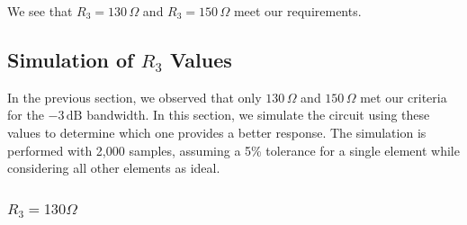 \documentclass[hidelinks,12pt]{article}
\begin{document}
	We see that \( R_3 = 130\,\Omega \) and \( R_3 = 150\,\Omega \) meet our requirements.

	\pagebreak
	
	\subsection{Simulation of \( R_3 \) Values}
	In the previous section, we observed that only \(130\,\Omega\) and \(150\,\Omega\) met our criteria for the \(-3\,\text{dB}\) bandwidth. In this section, we simulate the circuit using these values to determine which one provides a better response. The simulation is performed with 2,000 samples, assuming a 5\% tolerance for a single element while considering all other elements as ideal.
	
	
	\subsubsection{$R_3 = 130\Omega$}
\end{document}
